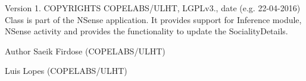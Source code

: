 \begin{DoxyVersion}{Version}
1. C\-O\-P\-Y\-R\-I\-G\-H\-T\-S C\-O\-P\-E\-L\-A\-B\-S/\-U\-L\-H\-T, L\-G\-P\-Lv3., date (e.\-g. 22-\/04-\/2016) Class is part of the N\-Sense application. It provides support for Inference module, N\-Sense activity and provides the functionality to update the Sociality\-Details. 
\end{DoxyVersion}
\begin{DoxyAuthor}{Author}
Saeik Firdose (C\-O\-P\-E\-L\-A\-B\-S/\-U\-L\-H\-T) 

Luis Lopes (C\-O\-P\-E\-L\-A\-B\-S/\-U\-L\-H\-T) 
\end{DoxyAuthor}
